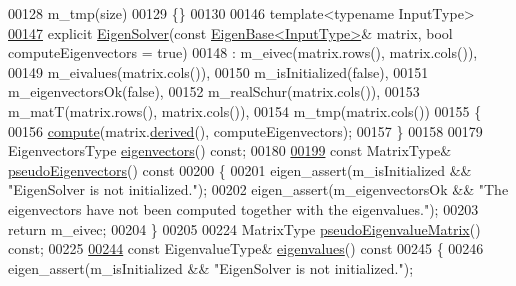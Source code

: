 \begin{DoxyCode}
00128         m\_tmp(size)
00129     \{\}
00130 
00146     \textcolor{keyword}{template}<\textcolor{keyword}{typename} InputType>
\hyperlink{group___eigenvalues___module_a7e8ab3d89ea525af5f27f1a8e805fae1}{00147}     \textcolor{keyword}{explicit} \hyperlink{group___eigenvalues___module_a7e8ab3d89ea525af5f27f1a8e805fae1}{EigenSolver}(\textcolor{keyword}{const} \hyperlink{group___core___module_struct_eigen_1_1_eigen_base}{EigenBase<InputType>}& matrix, \textcolor{keywordtype}{bool} 
      computeEigenvectors = \textcolor{keyword}{true})
00148       : m\_eivec(matrix.rows(), matrix.cols()),
00149         m\_eivalues(matrix.cols()),
00150         m\_isInitialized(false),
00151         m\_eigenvectorsOk(false),
00152         m\_realSchur(matrix.cols()),
00153         m\_matT(matrix.rows(), matrix.cols()), 
00154         m\_tmp(matrix.cols())
00155     \{
00156       \hyperlink{group___eigenvalues___module_a38d032b75b3e75640e3db42e7ab20c24}{compute}(matrix.\hyperlink{group___core___module_a324b16961a11d2ecfd2d1b7dd7946545}{derived}(), computeEigenvectors);
00157     \}
00158 
00179     EigenvectorsType \hyperlink{group___eigenvalues___module_a66288022802172e3ee059283b26201d7}{eigenvectors}() \textcolor{keyword}{const};
00180 
\hyperlink{group___eigenvalues___module_a4e796226f06e1f7347cf03a38755a155}{00199}     \textcolor{keyword}{const} MatrixType& \hyperlink{group___eigenvalues___module_a4e796226f06e1f7347cf03a38755a155}{pseudoEigenvectors}()\textcolor{keyword}{ const}
00200 \textcolor{keyword}{    }\{
00201       eigen\_assert(m\_isInitialized && \textcolor{stringliteral}{"EigenSolver is not initialized."});
00202       eigen\_assert(m\_eigenvectorsOk && \textcolor{stringliteral}{"The eigenvectors have not been computed together with the
       eigenvalues."});
00203       \textcolor{keywordflow}{return} m\_eivec;
00204     \}
00205 
00224     MatrixType \hyperlink{group___eigenvalues___module_a4979eafe0aeef06b19ada7fa5e19db17}{pseudoEigenvalueMatrix}() \textcolor{keyword}{const};
00225 
\hyperlink{group___eigenvalues___module_a114189009e42f5e03372a7a3dfa33b97}{00244}     \textcolor{keyword}{const} EigenvalueType& \hyperlink{group___eigenvalues___module_a114189009e42f5e03372a7a3dfa33b97}{eigenvalues}()\textcolor{keyword}{ const}
00245 \textcolor{keyword}{    }\{
00246       eigen\_assert(m\_isInitialized && \textcolor{stringliteral}{"EigenSolver is not initialized."});

\end{DoxyCode}
